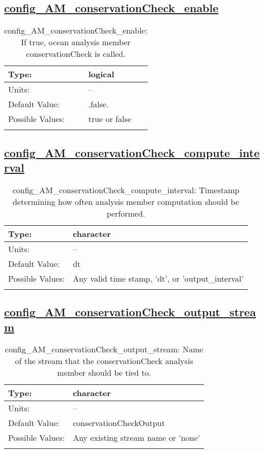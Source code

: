 \subsection[config\_AM\_conservationCheck\_enable]{\hyperref[sec:nm_tab_AM_conservationCheck]{config\_AM\_conservationCheck\_enable}}
\label{subsec:nm_sec_config_AM_conservationCheck_enable}
\begin{center}
\begin{longtable}{| p{2.0in} || p{4.0in} |}
    \hline
    Type: & logical \\
    \hline
    Units: & -- \\
    \hline
    Default Value: & .false. \\
    \hline
    Possible Values: & true or false \\
    \hline
    \caption{config\_AM\_conservationCheck\_enable: If true, ocean analysis member conservationCheck is called.}
\end{longtable}
\end{center}
\subsection[config\_AM\_conservationCheck\_compute\_interval]{\hyperref[sec:nm_tab_AM_conservationCheck]{config\_AM\_conservationCheck\_compute\_interval}}
\label{subsec:nm_sec_config_AM_conservationCheck_compute_interval}
\begin{center}
\begin{longtable}{| p{2.0in} || p{4.0in} |}
    \hline
    Type: & character \\
    \hline
    Units: & -- \\
    \hline
    Default Value: & dt \\
    \hline
    Possible Values: & Any valid time stamp, 'dt', or 'output\_interval' \\
    \hline
    \caption{config\_AM\_conservationCheck\_compute\_interval: Timestamp determining how often analysis member computation should be performed.}
\end{longtable}
\end{center}
\subsection[config\_AM\_conservationCheck\_output\_stream]{\hyperref[sec:nm_tab_AM_conservationCheck]{config\_AM\_conservationCheck\_output\_stream}}
\label{subsec:nm_sec_config_AM_conservationCheck_output_stream}
\begin{center}
\begin{longtable}{| p{2.0in} || p{4.0in} |}
    \hline
    Type: & character \\
    \hline
    Units: & -- \\
    \hline
    Default Value: & conservationCheckOutput \\
    \hline
    Possible Values: & Any existing stream name or 'none' \\
    \hline
    \caption{config\_AM\_conservationCheck\_output\_stream: Name of the stream that the conservationCheck analysis member should be tied to.}
\end{longtable}
\end{center}
